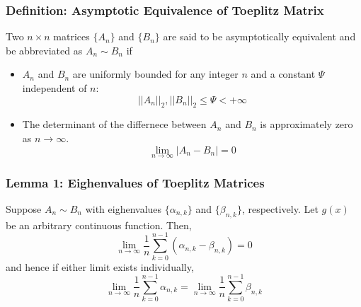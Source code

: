 \documentclass{beamer}
\begin{document}
\begin{frame}
\frametitle{Definition: Asymptotic Equivalence of Toeplitz Matrix}
\begin{block}{}
\cite{Gray:2006} Two $n\times n$ matrices $\{A_n\}$ and $\{B_n\}$ are said to be asymptotically equivalent and be abbreviated as $A_n\sim B_n$ if
  \begin{itemize}
    \item $A_n$ and $B_n$ are uniformly bounded for any integer $n$ and a constant $\Psi$ independent of $n$:
      \begin{equation}
        ||A_n||_2, ||B_n||_2\leq\Psi<+\infty
      \end{equation}
    \item The determinant of the differnece between $A_n$ and $B_n$ is approximately zero as $n\to\infty$.
      \begin{equation}
        \lim_{n\to\infty}|A_n-B_n|=0
      \end{equation}
  \end{itemize}
\end{block}
\end{frame}

\begin{frame}
\frametitle{Lemma 1: Eighenvalues of Toeplitz Matrices}
\begin{block}{}
  \cite[Lemma 1]{Gray:2006} Suppose $A_n\sim B_n$ with eighenvalues $\{\alpha_{n,k}\}$ and $\{\beta_{n,k}\}$, respectively. Let $g(x)$ be an arbitrary continuous function. Then,
  \begin{equation}
    \lim_{n\to\infty}\frac{1}{n}\sum_{k=0}^{n-1}(\alpha_{n,k}-\beta_{n,k})=0
  \end{equation}
  and hence if either limit exists individually,
  \begin{equation}
    \lim_{n\to\infty}\frac{1}{n}\sum_{k=0}^{n-1}\alpha_{n,k}=\lim_{n\to\infty}\frac{1}{n}\sum_{k=0}^{n-1}\beta_{n,k}
  \end{equation}
\end{block}
\end{frame}
\end{document}
